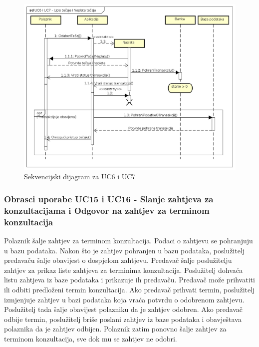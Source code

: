					\begin{figure}[h]
						\includegraphics[scale=0.56]{dijagrami/UML_sd_UC6UC7.PNG}
						\centering
						\caption{Sekvencijski dijagram za UC6 i UC7}
						\label{fig:UML_sd_UC6UC7}
					\end{figure}
				
				\eject
				\subsubsection{Obrasci uporabe UC15 i UC16 - Slanje zahtjeva za konzultacijama i Odgovor na zahtjev za terminom konzultacija}
				
					Polaznik šalje zahtjev za terminom konzultacija. Podaci o zahtjevu se pohranjuju u bazu podataka. \newline
					Nakon što je zahtjev pohranjen u bazu podataka, 	poslužitelj predavaču šalje obavijest o dospjelom zahtjevu. Predavač šalje poslužitelju zahtjev za prikaz liste zahtjeva za terminima konzultacija. Poslužitelj dohvaća listu zahtjeva iz baze podataka i prikazuje ih predavaču. Predavač može prihvatiti ili odbiti predloženi termin konzultacija. Ako predavač prihvati termin, poslužitelj izmjenjuje zahtjev u bazi podataka koja vraća potvrdu o odobrenom zahtjevu. Poslužitelj tada šalje obavijest polazniku da je zahtjev odobren. Ako predavač odbije termin, poslužitelj briše poslani zahtjev iz baze podataka i obavještava polaznika da je zahtjev odbijen. Polaznik zatim ponovno šalje zahtjev za terminom konzultacija, sve dok mu se zahtjev ne odobri.
				\eject
				
